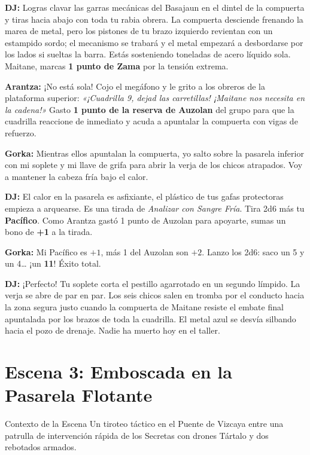 \textbf{DJ:} Logras clavar las garras mecánicas del Basajaun en el dintel de la compuerta y tiras hacia abajo con toda tu rabia obrera. La compuerta desciende frenando la marea de metal, pero los pistones de tu brazo izquierdo revientan con un estampido sordo; el mecanismo se trabará y el metal empezará a desbordarse por los lados si sueltas la barra. Estás sosteniendo toneladas de acero líquido sola. Maitane, marcas \textbf{1 punto de Zama} por la tensión extrema.

\textbf{Arantza:} ¡No está sola! Cojo el megáfono y le grito a los obreros de la plataforma superior: \textit{«¡Cuadrilla 9, dejad las carretillas! ¡Maitane nos necesita en la cadena!»} Gasto \textbf{1 punto de la reserva de Auzolan} del grupo para que la cuadrilla reaccione de inmediato y acuda a apuntalar la compuerta con vigas de refuerzo.

\textbf{Gorka:} Mientras ellos apuntalan la compuerta, yo salto sobre la pasarela inferior con mi soplete y mi llave de grifa para abrir la verja de los chicos atrapados. Voy a mantener la cabeza fría bajo el calor.

\textbf{DJ:} El calor en la pasarela es asfixiante, el plástico de tus gafas protectoras empieza a arquearse. Es una tirada de \textit{Analizar con Sangre Fría}. Tira 2d6 más tu \textbf{Pacífico}. Como Arantza gastó 1 punto de Auzolan para apoyarte, sumas un bono de \textbf{+1} a la tirada.

\textbf{Gorka:} Mi Pacífico es $+1$, más 1 del Auzolan son $+2$. Lanzo los 2d6: saco un 5 y un 4\dots{} ¡un \textbf{11}! Éxito total.

\textbf{DJ:} ¡Perfecto! Tu soplete corta el pestillo agarrotado en un segundo límpido. La verja se abre de par en par. Los seis chicos salen en tromba por el conducto hacia la zona segura justo cuando la compuerta de Maitane resiste el embate final apuntalada por los brazos de toda la cuadrilla. El metal azul se desvía silbando hacia el pozo de drenaje. Nadie ha muerto hoy en el taller.

\section{Escena 3: Emboscada en la Pasarela Flotante}

\begin{CajaAmbientacion}{Contexto de la Escena}
Un tiroteo táctico en el Puente de Vizcaya entre una patrulla de intervención rápida de los Secretas con drones Tártalo y dos rebotados armados.
\end{CajaAmbientacion}

